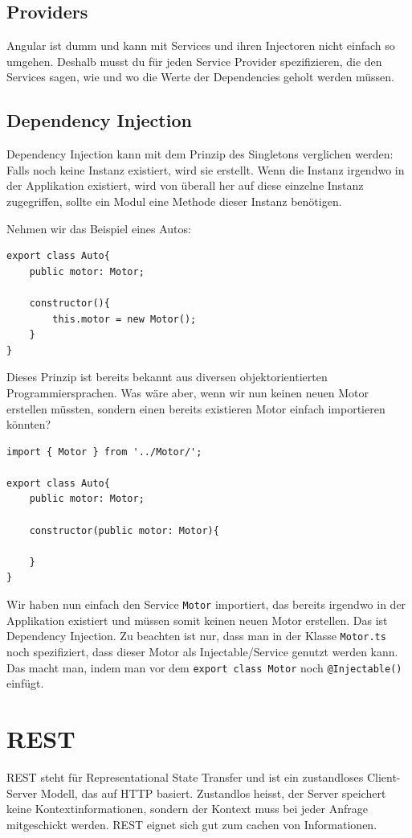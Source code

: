 \documentclass[a4paper, 11pt]{article}
\newcommand{\code}[1]{\texttt{#1}}
\begin{document}
\subsection{Providers}
Angular ist dumm und kann mit Services und ihren Injectoren nicht einfach so umgehen. Deshalb musst du für jeden Service Provider spezifizieren, die den Services sagen, wie und wo die Werte der Dependencies geholt werden müssen.

\subsection{Dependency Injection}
Dependency Injection kann mit dem Prinzip des Singletons verglichen werden: Falls noch keine Instanz existiert, wird sie erstellt. Wenn die Instanz irgendwo in der Applikation existiert, wird von überall her auf diese einzelne Instanz zugegriffen, sollte ein Modul eine Methode dieser Instanz benötigen.
\vspace{10px}

\noindent Nehmen wir das Beispiel eines Autos:
\begin{lstlisting}
export class Auto{
	public motor: Motor;
	
	constructor(){
		this.motor = new Motor();
	}
}
\end{lstlisting}
Dieses Prinzip ist bereits bekannt aus diversen objektorientierten Programmiersprachen. Was wäre aber, wenn wir nun keinen neuen Motor erstellen müssten, sondern einen bereits existieren Motor einfach importieren könnten?
\begin{lstlisting}
import { Motor } from '../Motor/';

export class Auto{
	public motor: Motor;
	
	constructor(public motor: Motor){
	
	}
}
\end{lstlisting}
Wir haben nun einfach den Service \code{Motor} importiert, das bereits irgendwo in der Applikation existiert und müssen somit keinen neuen Motor erstellen. Das ist Dependency Injection. Zu beachten ist nur, dass man in der Klasse \code{Motor.ts} noch spezifiziert, dass dieser Motor als Injectable/Service genutzt werden kann. Das macht man, indem man vor dem \code{export class Motor} noch \code{@Injectable()} einfügt.

\newpage

\section{REST}
REST steht für Representational State Transfer und ist ein zustandloses Client-Server Modell, das auf HTTP basiert. Zustandlos heisst, der Server speichert keine Kontextinformationen, sondern der Kontext muss bei jeder Anfrage mitgeschickt werden. REST eignet sich gut zum cachen von Informationen.
\vspace{10px}
\end{document}
